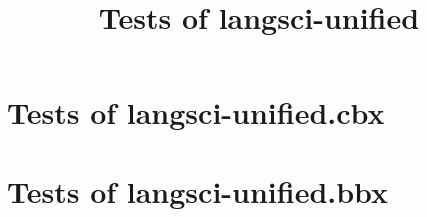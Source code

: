 \documentclass[a4paper,11pt]{article}
\title{Tests of langsci-unified}
\begin{document}
\maketitle

\section{Tests of langsci-unified.cbx}



\newpage

\section{Tests of langsci-unified.bbx}



\newpage
 
\printbibliography 
\end{document}
